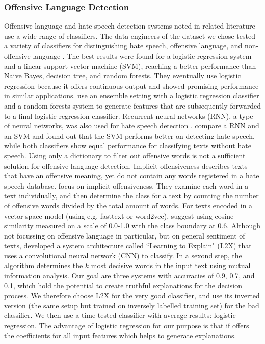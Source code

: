 \subsubsection{Offensive Language Detection}
Offensive language and hate speech detection systems noted in related literature use a wide range of classifiers.\newline
The data engineers of the dataset we chose tested a variety of classifiers for distinguishing hate speech, offensive language, and non-offensive language \cite{davidson2017automated}. The best results were found for a logistic regression system and a linear support vector machine (SVM), reaching a better performance than Naive Bayes, decision tree, and random forests. They eventually use logistic regression because it offers continuous output and showed promising performance in similar applications. \cite{montani2018tuwienkbs} use an ensemble setting with a logistic regression classifier and a random forests system to generate features that are subsequently forwarded to a final logistic regression classifier. Recurrent neural networks (RNN), a type of neural networks, was also used for hate speech detection \cite{del2017hate, rother2018ulmfit}. \cite{del2017hate} compare a RNN and an SVM and found out that the SVM performs better on detecting hate speech, while both classifiers show equal performance for classifying texts without hate speech. Using only a dictionary to filter out offensive words is not a sufficient solution for offensive language detection. Implicit offensiveness describes texts that have an offensive meaning, yet do not contain any words registered in a hate speech database. \cite{klenner2018offensive} focus on implicit offensiveness. They examine each word in a text individually, and then determine the class for a text by counting the number of offensive words divided by the total amount of words. For texts encoded in a vector space model (using e.g. fasttext or word2vec), \cite{gupta2018proposed} suggest using cosine similarity measured on a scale of 0.0-1.0 with the class boundary at 0.6. Although not focussing on offensive language in particular, but on general sentiment of texts, \cite{chen2018learning} developed a system architecture called ``Learning to Explain" (L2X) that uses a convolutional neural network (CNN) to classify. In a sexond step, the algorithm determines the $k$ most decisive words in the input text using mutual information analysis. \medskip \newline
Our goal are three systems with accuracies of 0.9, 0.7, and 0.1, which hold the potential to create truthful explanations for the decision process. We therefore choose L2X for the very good classifier, and use its inverted version (the same setup but trained on inversely labelled training set) for the bad classifier. We then use a time-tested classifier with average results: logistic regression. The advantage of logistic regression for our purpose is that if offers the coefficients for all input features which helps to generate explanations. 

